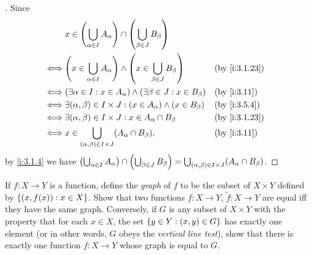 \begin{proof}[]
  Since
  \begin{align*}
         & x \in \pa{\bigcup_{\alpha \in I} A_\alpha} \cap \pa{\bigcup_{\beta \in J} B_\beta}                           \\
    \iff & \pa{x \in \bigcup_{\alpha \in I} A_\alpha} \land \pa{x \in \bigcup_{\beta \in J} B_\beta} &  & \by{i:3.1.23} \\
    \iff & \pa{\exists \alpha \in I : x \in A_\alpha} \land \pa{\exists \beta \in J : x \in B_\beta} &  & \by{i:3.11}   \\
    \iff & \exists (\alpha, \beta) \in I \times J : (x \in A_\alpha) \land (x \in B_\beta)           &  & \by{i:3.5.4}  \\
    \iff & \exists (\alpha, \beta) \in I \times J : x \in A_\alpha \cap B_\beta                      &  & \by{i:3.1.23} \\
    \iff & x \in \bigcup_{(\alpha, \beta) \in I \times J} (A_\alpha \cap B_\beta),                   &  & \by{i:3.11}
  \end{align*}
  by \cref{i:3.1.4} we have \(\left\lparen\bigcup_{\alpha \in I} A_\alpha\right\rparen \cap \left\lparen\bigcup_{\beta \in J} B_\beta\right\rparen = \bigcup_{(\alpha, \beta) \in I \times J} (A_\alpha \cap B_\beta)\).
\end{proof}

\begin{ex}\label{i:ex:3.5.10}
  If \(f : X \to Y\) is a function, define the \emph{graph} of \(f\) to be the subset of \(X \times Y\) defined by \(\left\lbrace(x, f(x)) : x \in X\right\rbrace\).
  Show that two functions \(f : X \to Y\), \(\tilde{f} : X \to Y\) are equal iff they have the same graph.
  Conversely, if \(G\) is any subset of \(X \times Y\) with the property that for each \(x \in X\), the set \(\left\lbrace y \in Y : (x, y) \in G\right\rbrace\) has exactly one element (or in other words, \(G\) obeys the \emph{vertical line test}), show that there is exactly one function \(f : X \to Y\) whose graph is equal to \(G\).
\end{ex}

